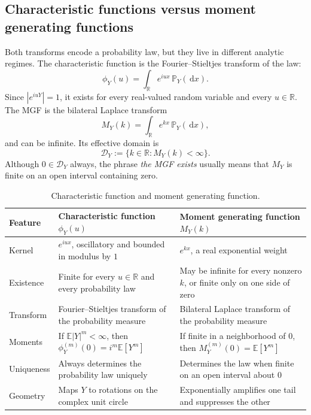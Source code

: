 \documentclass[10pt,a4paper]{article}
\numberwithin{equation}{section}
\theoremstyle{blueplain}
\theoremstyle{definition}
\newcommand{\E}{\mathbb E}
\newcommand{\Pp}{\mathbb P}
\newcommand{\R}{\mathbb R}
\newcommand{\dd}{\,\mathrm d}
\begin{document}
\subsection{Characteristic functions versus moment generating functions}

Both transforms encode a probability law, but they live in different analytic
regimes.  The characteristic function is the Fourier--Stieltjes transform of
the law:
\[
  \phi_Y(u)=\int_{\R}e^{iux}\,\Pp_Y(\dd x).
\]
Since \(|e^{iuY}|=1\), it exists for every real-valued random variable and
every \(u\in\R\).  The MGF is the bilateral Laplace transform
\[
  M_Y(k)=\int_{\R}e^{kx}\,\Pp_Y(\dd x),
\]
and can be infinite.  Its effective domain is
\begin{equation}
  \mathcal D_Y:=\{k\in\R:M_Y(k)<\infty\}.
  \label{eq:mgf-domain}
\end{equation}
Although \(0\in\mathcal D_Y\) always, the phrase \emph{the MGF exists} usually
means that \(M_Y\) is finite on an open interval containing zero.

\begin{table}[ht]
\centering
\caption{Characteristic function and moment generating function.}
\small
\begin{tabularx}{\textwidth}{@{}p{2.7cm}XX@{}}
\toprule
Feature & Characteristic function \(\phi_Y(u)\) & Moment generating function \(M_Y(k)\) \\
\midrule
Kernel
& \(e^{iux}\), oscillatory and bounded in modulus by \(1\)
& \(e^{kx}\), a real exponential weight \\
\addlinespace
Existence
& Finite for every \(u\in\R\) and every probability law
& May be infinite for every nonzero \(k\), or finite only on one side of zero \\
\addlinespace
Transform
& Fourier--Stieltjes transform of the probability measure
& Bilateral Laplace transform of the probability measure \\
\addlinespace
Moments
& If \(\E|Y|^m<\infty\), then
  \(\phi_Y^{(m)}(0)=i^m\E[Y^m]\)
& If finite in a neighborhood of \(0\), then
  \(M_Y^{(m)}(0)=\E[Y^m]\) \\
\addlinespace
Uniqueness
& Always determines the probability law uniquely
& Determines the law when finite on an open interval about \(0\) \\
\addlinespace
Geometry
& Maps \(Y\) to rotations on the complex unit circle
& Exponentially amplifies one tail and suppresses the other \\
\bottomrule
\end{tabularx}
\end{table}
\end{document}
